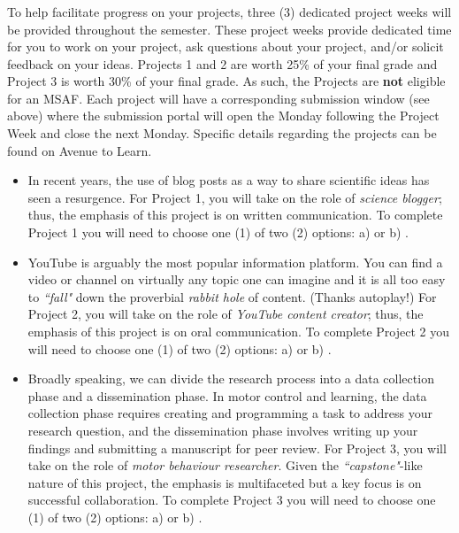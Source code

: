 \documentclass[hidelinks,11pt]{article}
\begin{document}
\vspace{-1em}\subsubsection*{{}}
To help facilitate progress on your projects, three (3) dedicated project weeks will be provided throughout the semester. These project weeks provide dedicated time for you to work on your project, ask questions about your project, and/or solicit feedback on your ideas. Projects 1 and 2 are worth 25\% of your final grade and Project 3 is worth 30\% of your final grade. As such, the Projects are \textbf{not} eligible for an MSAF. Each project will have a corresponding submission window (see above) where the submission portal will open the Monday following the Project Week and close the next Monday. Specific details regarding the projects can be found on Avenue to Learn.
  \begin{itemize}
    \item {} In recent years, the use of blog posts as a way to share scientific ideas has seen a resurgence. For Project 1, you will take on the role of \emph{science blogger}; thus, the emphasis of this project is on written communication. To complete Project 1 you will need to choose one (1) of two (2) options: a) {} or b) {}.
    \item {} YouTube is arguably the most popular information platform. You can find a video or channel on virtually any topic one can imagine and it is all too easy to \emph{``fall"} down the proverbial \emph{rabbit hole} of content. (Thanks autoplay!) For Project 2, you will take on the role of \emph{YouTube content creator}; thus, the emphasis of this project is on oral communication. To complete Project 2 you will need to choose one (1) of two (2) options: a) {} or b) {}.
    \item {} Broadly speaking, we can divide the research process into a data collection phase and a dissemination phase. In motor control and learning, the data collection phase requires creating and programming a task to address your research question, and the dissemination phase involves writing up your findings and submitting a manuscript for peer review. For Project 3, you will take on the role of \emph{motor behaviour researcher}. Given the \emph{``capstone"}-like nature of this project, the emphasis is multifaceted but a key focus is on successful collaboration. To complete Project 3 you will need to choose one (1) of two (2) options: a) {} or b) {}.
  \end{itemize}
\end{document}
